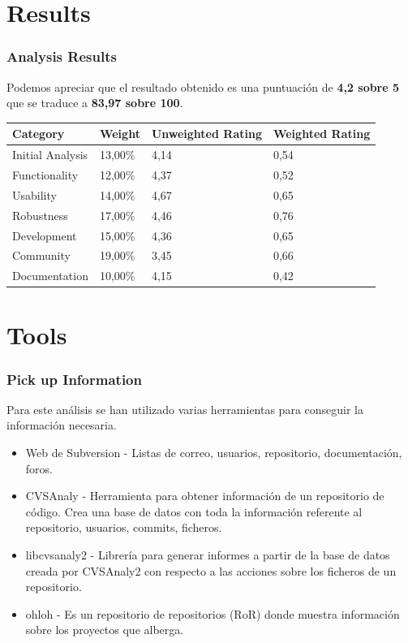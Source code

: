 \documentclass[xcolor=dvipsnames]{beamer}
\begin{document}
\section{Results}
\begin{frame}[allowframebreaks]
\frametitle{Analysis Results}

Podemos apreciar que el resultado obtenido es una puntuaci\'on de \textbf{4,2 sobre 5} que se traduce a \textbf{83,97 sobre 100}.

\begin{tabular}{|l|l|l|l|}
    \hline {\bf Category} & {\bf Weight} & {\bf Unweighted Rating} & {\bf Weighted Rating}\\
    \hline Initial Analysis	 & 13,00\% & 4,14 & 0,54 \\
    \hline Functionality & 12,00\% & 4,37 & 0,52\\
    \hline Usability & 14,00\% & 4,67 & 0,65\\
    \hline Robustness & 17,00\% & 4,46 & 0,76\\
    \hline Development & 15,00\% & 4,36 & 0,65\\
    \hline Community & 19,00\% & 3,45 & 0,66\\
    \hline Documentation & 10,00\% & 4,15 & 0,42\\
    \hline
\end{tabular}

\end{frame}

\section{Tools}
\begin{frame}[allowframebreaks]
\frametitle{Pick up Information}

\par Para este an\'alisis se han utilizado varias herramientas para conseguir la informaci\'on necesaria.

\begin{itemize}
    \item Web de Subversion - Listas de correo, usuarios, repositorio, documentaci\'on, foros.
    \item CVSAnaly - Herramienta para obtener informaci\'on de un repositorio de c\'odigo. Crea una base de datos con toda la informaci\'on referente al repositorio, usuarios, commits, ficheros.
    \item libcvsanaly2 - Librer\'ia para generar informes a partir de la base de datos creada por CVSAnaly2 con respecto a las acciones sobre los ficheros de un repositorio.
    \item ohloh - Es un repositorio de repositorios (RoR) donde muestra informaci\'on sobre los proyectos que alberga.

\end{itemize}

\end{frame}
\end{document}
